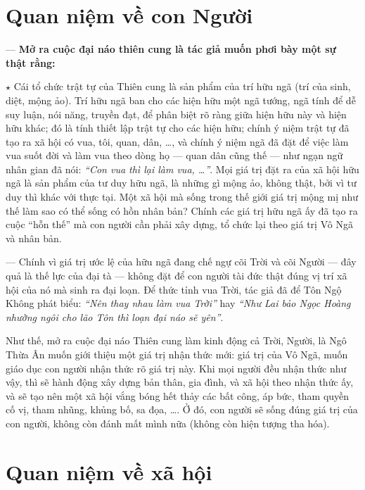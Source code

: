 
\section{Quan niệm về con Người} %
\label{sec:4_con_nguoi}

— {\bf Mở ra cuộc đại náo thiên cung là tác giả muốn phơi bày một sự thật rằng:}

$\star$ Cái tổ chức trật tự của Thiên cung là sản phẩm của trí hữu ngã (trí của sinh, diệt, mộng ảo). Trí hữu ngã ban cho các hiện hữu một ngã tướng, ngã tính để dễ suy luận, nói năng, truyền đạt, để phân biệt rõ ràng giữa hiện hữu này và hiện hữu khác; đó là tính thiết lập trật tự cho các hiện hữu; chính ý niệm trật tự đã tạo ra xã hội có vua, tôi, quan, dân, \ldots, và chính ý niệm ngã đã đặt để việc làm vua suốt đời và làm vua theo dòng họ — quan dân cũng thế — như ngạn ngữ nhân gian đã nói: \emph{``Con vua thì lại làm vua, \ldots''}. Mọi giá trị đặt ra của xã hội hữu ngã là sản phẩm của tư duy hữu ngã, là những gì mộng ảo, không thật, bởi vì tư duy thì khác với thực tại. Một xã hội mà sống trong thế giới giá trị mộng mị như thế làm sao có thể sống có hồn nhân bản? Chính các giá trị hữu ngã ấy đã tạo ra cuộc ``hỗn thế'' mà con người cần phải xây dựng, tổ chức lại theo giá trị Vô Ngã và nhân bản.

— Chính vì giá trị ước lệ của hữu ngã đang chế ngự cõi Trời và cõi Người — đây quả là thế lực của đại tà — không đặt để con người tài đức thật đúng vị trí xã hội của nó mà sinh ra đại loạn. Để thức tỉnh vua Trời, tác giả đã để Tôn Ngộ Không phát biểu: \emph{``Nên thay nhau làm vua Trời''} hay \emph{``Như Lai bảo Ngọc Hoàng nhường ngôi cho lão Tôn thì loạn đại náo sẽ yên''}.

Như thế, mở ra cuộc đại náo Thiên cung làm kinh động cả Trời, Người, là Ngô Thừa Ân muốn giới thiệu một giá trị nhận thức mới: giá trị của Vô Ngã, muốn giáo dục con người nhận thức rõ giá trị này. Khi mọi người đều nhận thức như vậy, thì sẽ hành động xây dựng bản thân, gia đình, và xã hội theo nhận thức ấy, và sẽ tạo nên một xã hội vắng bóng hết thảy các bất công, áp bức, tham quyền cố vị, tham nhũng, khủng bố, sa đọa, \ldots. Ở đó, con người sẽ sống đúng giá trị của con người, không còn đánh mất mình nữa (không còn hiện tượng tha hóa).


\section{Quan niệm về xã hội} %
\label{sec:4_xa_hoi}

